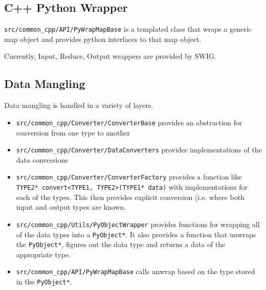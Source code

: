 \subsection{C++ Python Wrapper}
\verb|src/common_cpp/API/PyWrapMapBase| is a templated class that wraps a 
generic map object and provides python interfaces to that map object.

Currently, Input, Reduce, Output wrappers are provided by SWIG.

\subsection{Data Mangling}
Data mangling is handled in a variety of layers.
\begin{itemize}
\item \verb|src/common_cpp/Converter/ConverterBase| provides an abstraction for
      conversion from one type to another
\item \verb|src/common_cpp/Converter/DataConverters| provides implementations
      of the data conversions
\item \verb|src/common_cpp/Converter/ConverterFactory| provides a function like\linebreak
      \verb|TYPE2* convert<TYPE1, TYPE2>(TYPE1* data)| with implementations for
      each of the types. This then provides explicit conversion (i.e. where both
      input and output types are known.
\item \verb|src/common_cpp/Utils/PyObjectWrapper| provides functions for 
      wrapping all of the data types into a \verb|PyObject*|. It also provides a 
      function that unwraps the \verb|PyObject*|, figures out the data type and 
      returns a data of the appropriate type.
\item \verb|src/common_cpp/API/PyWrapMapBase| calls unwrap based on the type
      stored in the \verb|PyObject*|.
\end{itemize}
